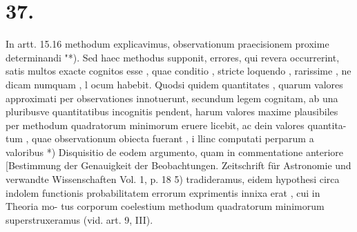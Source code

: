 \documentclass[12pt,a4paper]{article}
\begin{document}
\section*{\textbf{37.}}
In artt. 15.16 methodum explicavimus, observationum praecisionem proxime
determinandi "*). Sed haec methodus supponit, errores, qui revera occurrerint,
satis multos exacte cognitos esse , quae conditio , stricte loquendo , rarissime , ne
dicam numquam , l ocum habebit. Quodsi quidem quantitates , quarum valores
approximati per observationes innotuerunt, secundum legem cognitam, ab una
pluribusve quantitatibus incognitis pendent, harum valores maxime plausibiles
per methodum quadratorum minimorum eruere licebit, ac dein valores quantita-
tum , quae observationum obiecta fuerant , i llinc computati perparum a valoribus
*) Disquisitio de eodem argumento, quam in commentatione anteriore [Bestimmung der Genauigkeit
der Beobachtungen. Zeitschrift für Astronomie und verwandte Wissenschaften Vol. 1, p. 18 5) tradideramus,
eidem hypothesi circa indolem functionis probabilitatem errorum exprimentis innixa erat , cui in Theoria mo-
tus corporum coelestium methodum quadratorum minimorum superstruxeramus (vid. art. 9, III).
\end{document}
